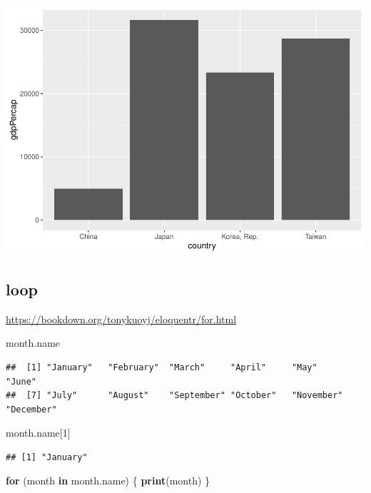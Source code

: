 \documentclass[
]{book}
\newenvironment{Shaded}{\begin{snugshade}}{\end{snugshade}}
\newcommand{\ControlFlowTok}[1]{\textcolor[rgb]{0.13,0.29,0.53}{\textbf{#1}}}
\newcommand{\DecValTok}[1]{\textcolor[rgb]{0.00,0.00,0.81}{#1}}
\newcommand{\FunctionTok}[1]{\textcolor[rgb]{0.13,0.29,0.53}{\textbf{#1}}}
\newcommand{\NormalTok}[1]{#1}
\theoremstyle{definition}
\theoremstyle{definition}
\theoremstyle{definition}
\theoremstyle{definition}
\theoremstyle{remark}
\begin{document}
\includegraphics{202402211401-R_files/figure-latex/unnamed-chunk-23-1.pdf}

\subsection{loop}\label{loop}

\url{https://bookdown.org/tonykuoyj/eloquentr/for.html}

\begin{Shaded}
\begin{Highlighting}[]
\NormalTok{month.name}
\end{Highlighting}
\end{Shaded}

\begin{verbatim}
##  [1] "January"   "February"  "March"     "April"     "May"       "June"     
##  [7] "July"      "August"    "September" "October"   "November"  "December"
\end{verbatim}

\begin{Shaded}
\begin{Highlighting}[]
\NormalTok{month.name[}\DecValTok{1}\NormalTok{]}
\end{Highlighting}
\end{Shaded}

\begin{verbatim}
## [1] "January"
\end{verbatim}

\begin{Shaded}
\begin{Highlighting}[]
\ControlFlowTok{for}\NormalTok{ (month }\ControlFlowTok{in}\NormalTok{ month.name) \{}
  \FunctionTok{print}\NormalTok{(month)}
\NormalTok{\}}
\end{Highlighting}
\end{Shaded}
\end{document}
